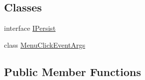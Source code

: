 \subsection*{Classes}
\begin{DoxyCompactItemize}
\item 
interface \hyperlink{interface_power_system_planning_wpf_app_1_1_control_utils_1_1_recent_file_list_1_1_i_persist}{I\+Persist}
\item 
class \hyperlink{class_power_system_planning_wpf_app_1_1_control_utils_1_1_recent_file_list_1_1_menu_click_event_args}{Menu\+Click\+Event\+Args}
\end{DoxyCompactItemize}
\subsection*{Public Member Functions}
